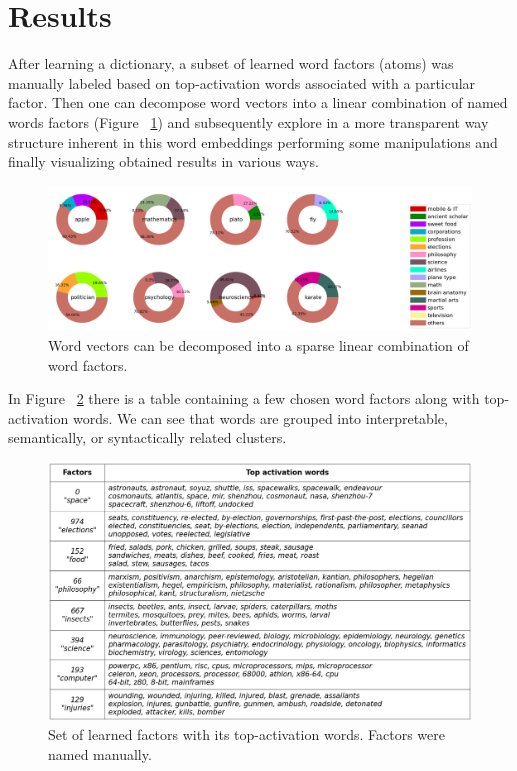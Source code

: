 \documentclass[10pt, a4paper, twocolumn]{article} %
\begin{document}

\section{Results}

After learning a dictionary, a subset of learned word factors (atoms) was manually labeled based on top-activation words associated with a particular factor. Then one can decompose word vectors into a linear combination of named words factors (Figure ~\ref{fig:decomp}) and subsequently explore in a more transparent way structure inherent in this word embeddings performing some manipulations and finally visualizing obtained results in various ways. 

\begin{figure}
	\includegraphics[width=\linewidth]{decomp.png} %
	\caption{Word vectors can be decomposed into a sparse linear combination of word factors.} %
	\label{fig:decomp} %
\end{figure}

In Figure ~\ref{fig:act} there is a table containing a few chosen word factors along with top-activation words. We can see that words are grouped into interpretable, semantically, or syntactically related clusters. 

\begin{figure}
	\includegraphics[width=\linewidth]{act_table.png} %
	\caption{Set of learned factors with its top-activation words. Factors were named manually.} %
	\label{fig:act} %
\end{figure}
\end{document}
